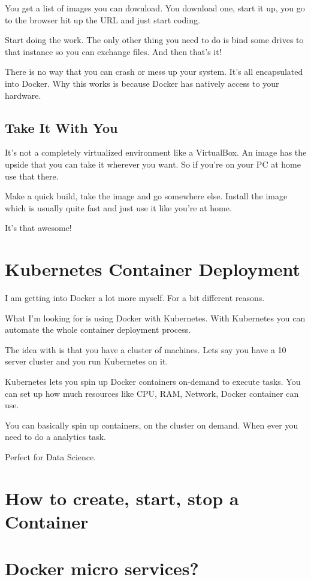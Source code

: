 \documentclass[12pt, numbers=noenddot]{scrreprt} %
\begin{document}
You get a list of images you can download. You download one, start it up, you go to the browser hit up the URL and just start coding.

Start doing the work. The only other thing you need to do is bind some drives to that instance so you can exchange files. And then that’s it!

There is no way that you can crash or mess up your system. It’s all encapsulated into Docker. Why this works is because Docker has natively access to your hardware.

\subsection{Take It With You}

It’s not a completely virtualized environment like a VirtualBox. An image has the upside that you can take it wherever you want. So if you're on your PC at home use that there.

Make a quick build, take the image and go somewhere else. Install the image which is usually quite fast and just use it like you’re at home.

It’s that awesome!

\section{Kubernetes Container Deployment}

I am getting into Docker a lot more myself. For a bit different reasons.

What I’m looking for is using Docker with Kubernetes. With Kubernetes you can automate the whole container deployment process.

The idea with is that you have a cluster of machines. Lets say you have a 10 server cluster and you run Kubernetes on it.

Kubernetes lets you spin up Docker containers on-demand to execute tasks. You can set up how much resources like CPU, RAM, Network, Docker container can use.

You can basically spin up containers, on the cluster on demand. When ever you need to do a analytics task.

Perfect for Data Science.
\section{How to create, start, stop a Container}
\section{Docker micro services?}
\end{document}
